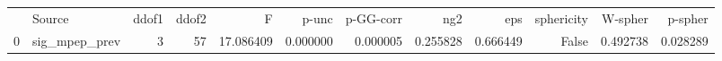 \begin{tabular}{llrrrrrrrrrr}
 & Source & ddof1 & ddof2 & F & p-unc & p-GG-corr & ng2 & eps & sphericity & W-spher & p-spher \\
0 & sig_mpep_prev & 3 & 57 & 17.086409 & 0.000000 & 0.000005 & 0.255828 & 0.666449 & False & 0.492738 & 0.028289 \\
\end{tabular}
